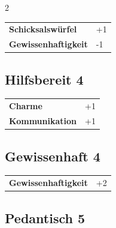\begin{multicols}{2}
\begin{tcolorbox}
\begin{tabular}{@{}ll@{}}
    \textbf{Schicksalswürfel} & +1\\
    \textbf{Gewissenhaftigkeit} & -1\\
\end{tabular}


\end{tcolorbox}

\begin{tcolorbox}
    \subsection*{Hilfsbereit \hfill \small{4 }}
    \tcblower




\begin{tabular}{@{}ll@{}}
    \textbf{Charme} & +1\\
    \textbf{Kommunikation} & +1\\
\end{tabular}


\end{tcolorbox}

\begin{tcolorbox}
    \subsection*{Gewissenhaft \hfill \small{4 }}
    \tcblower




\begin{tabular}{@{}ll@{}}
    \textbf{Gewissenhaftigkeit} & +2\\
\end{tabular}


\end{tcolorbox}

\begin{tcolorbox}
    \subsection*{Pedantisch \hfill \small{5 }}
    \tcblower





\end{tcolorbox}
\end{multicols}

